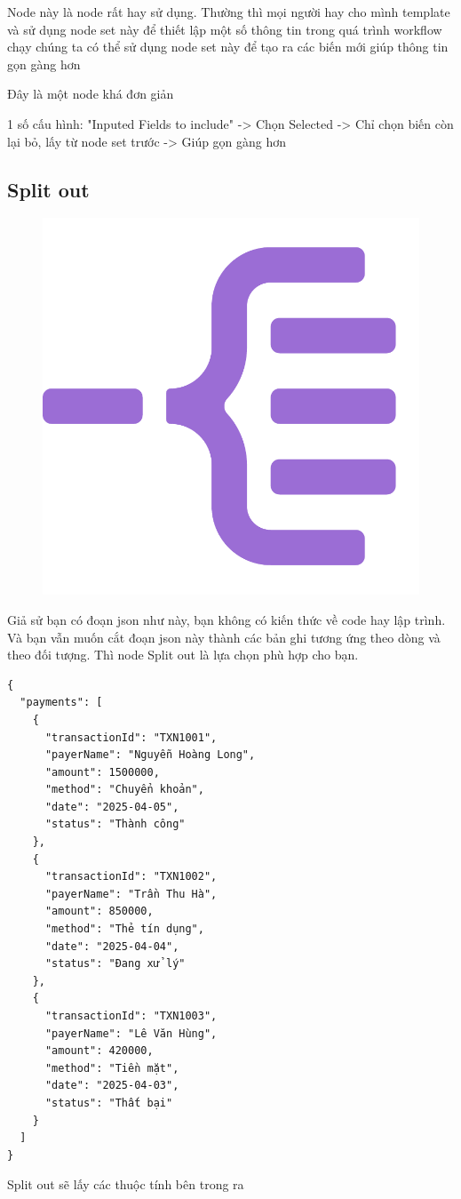 Node này là node rất hay sử dụng. Thường thì mọi người hay cho mình template và sử dụng node set này để thiết lập một số thông tin trong quá trình workflow chạy chúng ta có thể sử dụng node set này để tạo ra các biến mới giúp thông tin gọn gàng hơn

Đây là một node khá đơn giản


1 số cấu hình: "Inputed Fields to include" -> Chọn Selected -> Chỉ chọn biến còn lại bỏ, lấy từ node set trước -> Giúp gọn gàng hơn


\subsection{Split out}

\begin{figure}[htbp]
    \centering
    \includegraphics[width=0.4\linewidth]{Chap1-7/split-out.pdf}
\end{figure}

Giả sử bạn có đoạn json như này, bạn không có kiến thức về code hay lập trình. Và bạn vẫn muốn cắt đoạn json này thành các bản ghi tương ứng theo dòng và theo đối tượng. Thì node Split out là lựa chọn phù hợp cho bạn.

\begin{verbatim}
{
  "payments": [
    {
      "transactionId": "TXN1001",
      "payerName": "Nguyễn Hoàng Long",
      "amount": 1500000,
      "method": "Chuyển khoản",
      "date": "2025-04-05",
      "status": "Thành công"
    },
    {
      "transactionId": "TXN1002",
      "payerName": "Trần Thu Hà",
      "amount": 850000,
      "method": "Thẻ tín dụng",
      "date": "2025-04-04",
      "status": "Đang xử lý"
    },
    {
      "transactionId": "TXN1003",
      "payerName": "Lê Văn Hùng",
      "amount": 420000,
      "method": "Tiền mặt",
      "date": "2025-04-03",
      "status": "Thất bại"
    }
  ]
}
\end{verbatim}

Split out sẽ lấy các thuộc tính bên trong ra 

